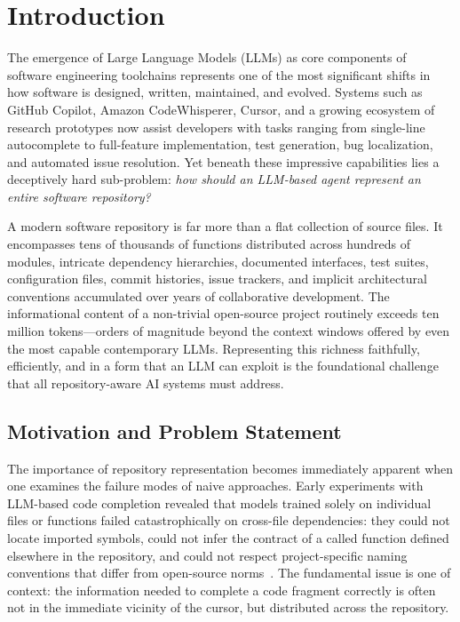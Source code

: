 \section{Introduction}
\label{sec:introduction}

The emergence of Large Language Models (LLMs) as core components of software engineering
toolchains represents one of the most significant shifts in how software is designed, written,
maintained, and evolved. Systems such as GitHub Copilot, Amazon CodeWhisperer, Cursor, and a
growing ecosystem of research prototypes now assist developers with tasks ranging from
single-line autocomplete to full-feature implementation, test generation, bug localization, and
automated issue resolution. Yet beneath these impressive capabilities lies a deceptively hard
sub-problem: \emph{how should an LLM-based agent represent an entire software repository?}

A modern software repository is far more than a flat collection of source files. It encompasses
tens of thousands of functions distributed across hundreds of modules, intricate dependency
hierarchies, documented interfaces, test suites, configuration files, commit histories, issue
trackers, and implicit architectural conventions accumulated over years of collaborative
development. The informational content of a non-trivial open-source project routinely exceeds
ten million tokens---orders of magnitude beyond the context windows offered by even the most
capable contemporary LLMs. Representing this richness faithfully, efficiently, and in a form
that an LLM can exploit is the foundational challenge that all repository-aware AI systems must
address.

\subsection{Motivation and Problem Statement}

The importance of repository representation becomes immediately apparent when one examines the
failure modes of naive approaches. Early experiments with LLM-based code completion revealed
that models trained solely on individual files or functions failed catastrophically on
cross-file dependencies: they could not locate imported symbols, could not infer the contract
of a called function defined elsewhere in the repository, and could not respect project-specific
naming conventions that differ from open-source norms~\cite{ding2023crosscodeeval,
liu2024repobench}. The fundamental issue is one of context: the information needed to complete
a code fragment correctly is often not in the immediate vicinity of the cursor, but distributed
across the repository.

